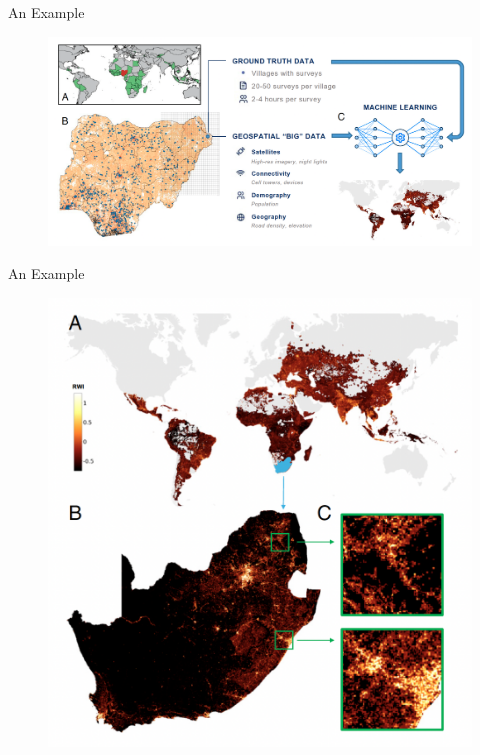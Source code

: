 \documentclass[aspectratio=169, xcolor=dvipsnames]{beamer}
\begin{document}
\begin{frame}{An Example}
\begin{figure}[h!]
  \centering
  \includegraphics[width=0.8 \textwidth]{Chi_2}
\end{figure}
\end{frame}

\begin{frame}{An Example}
\begin{figure}[h!]
  \centering
  \includegraphics[width=0.45 \textwidth]{Chi_3}
\end{figure}
\end{frame}
\end{document}
